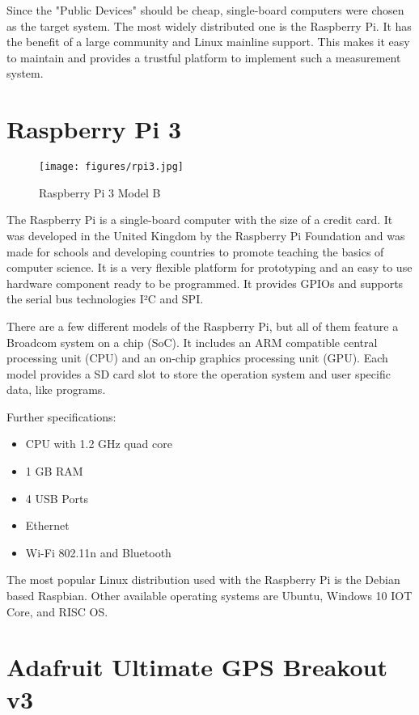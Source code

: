 Since the "Public Devices" should be cheap, single-board computers were chosen as the target system. The most widely distributed one is the Raspberry Pi. It has the benefit of a large community and Linux mainline support. This makes it easy to maintain and provides a trustful platform to implement such a measurement system.

\section{Raspberry Pi 3}

\begin{figure}[tb]
	\centering
	\texttt{[image: figures/rpi3.jpg]}
	\caption{Raspberry Pi 3 Model B}
	\label{fig:rpi3}
\end{figure}

The Raspberry Pi is a single-board computer with the size of a credit card. It was developed in the United Kingdom by the Raspberry Pi Foundation and was made for schools and developing countries to promote teaching the basics of computer science. It is a very flexible platform for prototyping and an easy to use hardware component ready to be programmed. It provides GPIOs and supports the serial bus technologies I²C and SPI.

There are a few different models of the Raspberry Pi, but all of them feature a Broadcom system on a chip (SoC). It includes an ARM compatible central processing unit (CPU) and an on-chip graphics processing unit (GPU). Each model provides a SD card slot to store the operation system and user specific data, like programs.

Further specifications:
\begin{itemize}
\item CPU with 1.2 GHz quad core
\item 1 GB RAM
\item 4 USB Ports
\item Ethernet
\item Wi-Fi 802.11n and Bluetooth
\end{itemize}

The most popular Linux distribution used with the Raspberry Pi is the Debian based Raspbian. Other available operating systems are Ubuntu, Windows 10 IOT Core, and RISC OS.

\section{Adafruit Ultimate GPS Breakout v3}

